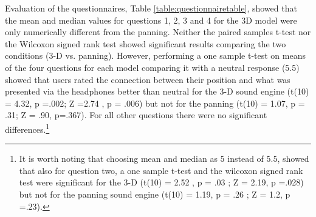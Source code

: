 \documentclass[journal]{IEEEtran}
\begin{document}
Evaluation of the questionnaires, Table \ref{table:questionnairetable}, showed that the mean and median values for questions 1, 2, 3 and 4 for the 3D model were only numerically different from the panning. Neither the paired samples t-test nor the Wilcoxon signed rank test showed significant results comparing the two conditions (3-D vs. panning). However, performing a one sample t-test on means of the four questions for each model comparing it with a neutral response (5.5) showed that users rated the connection between their position and what was presented via the headphones better than neutral for the 3-D sound engine (t(10) = 4.32, p =.002; Z =2.74 , p = .006) but not for the panning (t(10) = 1.07, p = .31; Z = .90, p=.367). For all other questions there were no significant differences.\footnote{It is worth noting that choosing mean and median as 5 instead of 5.5, showed that also for question two, a one sample t-test and the wilcoxon signed rank test were significant for the 3-D (t(10) = 2.52 , p = .03 ; Z = 2.19, p =.028) but not for the panning sound engine (t(10) = 1.19, p = .26 ; Z = 1.2, p =.23).}

\begin{table}[h]
  \caption{Questionnaire results}
  \label{table:questionnairetable}
\end{table}
\end{document}
